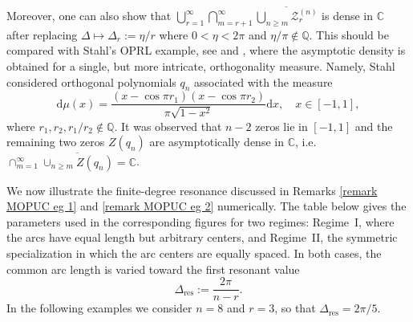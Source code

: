 \documentclass[a4paper,10pt,leqno]{amsart}
\numberwithin{equation}{section}
\theoremstyle{remark}
\newcommand{\dd}{\mathrm{d}}
\newcommand{\C}{\mathbb{C}}
\begin{document}
Moreover, one can also show that $ \bigcup^{\infty}_{r=1}\bigcap_{m=r+1}^{\infty} \overline{\bigcup_{n \geq m} \mathcal Z^{(n)}_{r}}$ is dense in  $\C$ after replacing $\Delta \mapsto \Delta_r := \eta/r$ where $0<\eta<2\pi$ and $\eta/\pi \notin \mathbb Q$. This should be compared with Stahl's  OPRL example, see \cite[Theorems 1 and 2]{Stahl84} and \cite[Theorem 1]{Stahl91},  where the asymptotic density is obtained for a single, but more intricate, orthogonality measure. Namely, Stahl considered orthogonal polynomials \(q_n\) associated with the measure
\[
\dd \mu(x) = \frac{(x - \cos \pi r_1)(x - \cos \pi r_2)}{\pi \sqrt{1 - x^2}} \dd x, \quad x \in [-1,1],
\]
where $r_1, r_2, r_1/r_2 \notin \mathbb Q$.    
It was observed that $n-2$ zeros lie in $[-1,1]$ and the remaining two zeros $Z(q_n)$ are asymptotically dense in $\C$, i.e. $\cap^{\infty}_{m=1} \overline{ \cup_{n \geq m} Z(q_n) } = \C$.  

 

We now illustrate the finite-degree resonance discussed in Remarks \ref{remark MOPUC eg 1} and \ref{remark MOPUC eg 2} numerically. The table below gives
the parameters used in the corresponding figures for two regimes: Regime~I,
where the arcs have equal length but arbitrary centers, and Regime~II, the
symmetric specialization in which the arc centers are equally spaced. In both
cases, the common arc length is varied toward the first resonant value
\[
\Delta_{\mathrm{res}}:=\frac{2\pi}{n-r}.
\]
In the following examples we consider \(n=8\) and \(r=3\), so that $\Delta_{\mathrm{res}}=2\pi/5$.
\end{document}
